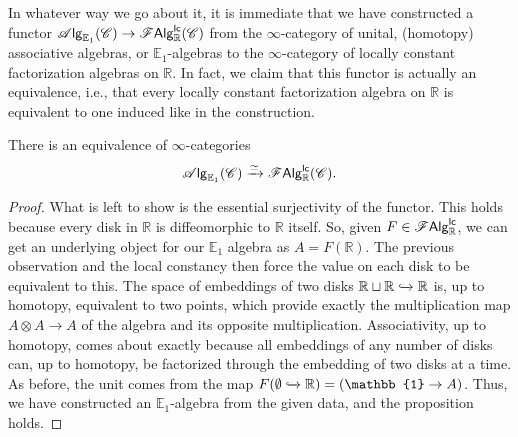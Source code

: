 \documentclass[../text]{subfiles}
\begin{document}
\begin{construction}
    In whatever way we go about it, it is immediate that we have constructed a functor $\mathscr{A} \mathsf{lg}_{\mathbb{E}_1}(\mathscr{C}) \rightarrow \mathscr{F} \mathsf{Alg}^{\mathsf{lc}}_{\mathbb{R}} (\mathscr{C})$ from the $\infty$-category of unital, (homotopy) associative algebras, or $\mathbb{E}_1$-algebras to the $\infty$-category of locally constant factorization algebras on $\mathbb{R}$. In fact, we claim that this functor is actually an equivalence, i.e., that every locally constant factorization algebra on $\mathbb{R}$ is equivalent to one induced like in the construction.
\end{construction}

\begin{proposition}\label{prop:R_gives_E1}
    There is an equivalence of $\infty$-categories
    \begin{equation}
        \mathscr{A} \mathsf{lg}_{\mathbb{E}_1}(\mathscr{C}) \xrightarrow{\simeq} \mathscr{F} \mathsf{Alg}^{\mathsf{lc}}_{\mathbb{R}} (\mathscr{C}).
    \end{equation}
\end{proposition}

\begin{proof}
    What is left to show is the essential surjectivity of the functor. This holds because every disk in $\mathbb{R}$ is diffeomorphic to $\mathbb{R}$ itself. So, given $F \in \mathscr{F} \mathsf{Alg}^{\mathsf{lc}}_{\mathbb{R}}$, we can get an underlying object for our $\mathbb{E}_1$ algebra as $A = F(\mathbb{R})$. The previous observation and the local constancy then force the value on each disk to be equivalent to this. The space of embeddings of two disks $\mathbb{R} \sqcup \mathbb{R} \xhookrightarrow{} \mathbb{R}$ is, up to homotopy, equivalent to two points, which provide exactly the multiplication map $ A \otimes A \rightarrow A$ of the algebra and its opposite multiplication.  Associativity, up to homotopy, comes about exactly because all embeddings of any number of disks can, up to homotopy, be factorized through the embedding of two disks at a time. As before, the unit comes from the map $F(\emptyset \xhookrightarrow{} \mathbb{R}) = (\mathbb{1} \rightarrow A)$. Thus, we have constructed an $\mathbb{E}_1$-algebra from the given data, and the proposition holds.
\end{proof}
\end{document}
